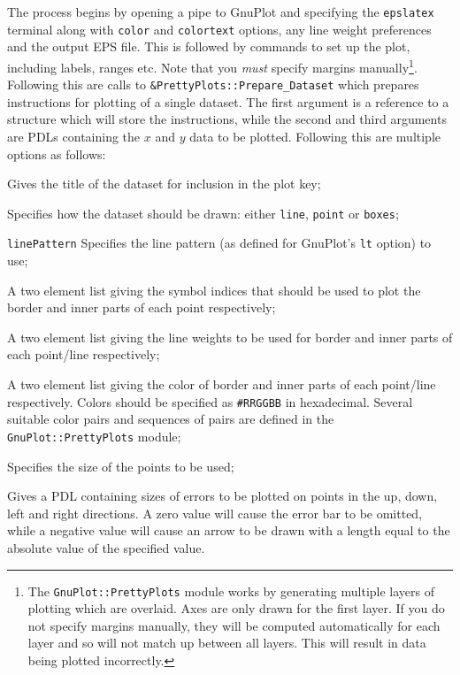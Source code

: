 The process begins by opening a pipe to {\sc GnuPlot} and specifying the {\tt epslatex} terminal along with {\tt color} and {\tt colortext} options, any line weight preferences and the output EPS file. This is followed by commands to set up the plot, including labels, ranges etc. Note that you \emph{must} specify margins manually\footnote{The {\tt GnuPlot::PrettyPlots} module works by generating multiple layers of plotting which are overlaid. Axes are only drawn for the first layer. If you do not specify margins manually, they will be computed automatically for each layer and so will not match up between all layers. This will result in data being plotted incorrectly.}. Following this are calls to {\tt \&PrettyPlots::Prepare\_Dataset} which prepares instructions for plotting of a single dataset. The first argument is a reference to a structure which will store the instructions, while the second and third arguments are PDLs containing the $x$ and $y$ data to be plotted. Following this are multiple options as follows:
\begin{description}
\item[{\tt title}] Gives the title of the dataset for inclusion in the plot key;
\item[{\tt style}] Specifies how the dataset should be drawn: either {\tt line}, {\tt point} or {\tt boxes};
\item{{\tt linePattern}} Specifies the line pattern (as defined for {\sc GnuPlot}'s {\tt lt} option) to use;
\item[{\tt symbol}] A two element list giving the symbol indices that should be used to plot the border and inner parts of each point respectively;
\item[{\tt weight}] A two element list giving the line weights to be used for border and inner parts of each point/line respectively;
\item[{\tt color}] A two element list giving the color of border and inner parts of each point/line respectively. Colors should be specified as {\tt \#RRGGBB} in hexadecimal. Several suitable color pairs and sequences of pairs are defined in the {\tt GnuPlot::PrettyPlots} module;
\item[{\tt pointSize}] Specifies the size of the points to be used;
\item[{\tt errorNNN}] Gives a PDL containing sizes of errors to be plotted on points in the up, down, left and right directions. A zero value will cause the error bar to be omitted, while a negative value will cause an arrow to be drawn with a length equal to the absolute value of the specified value.
\end{description}
